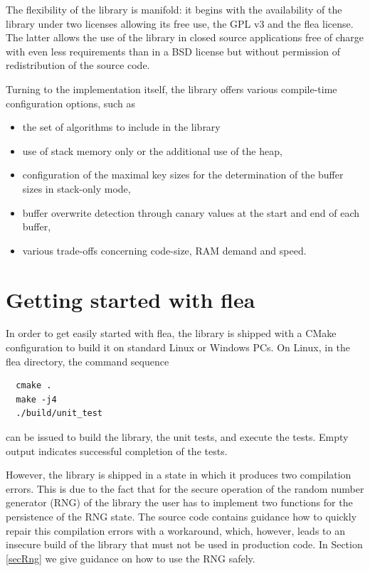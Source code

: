 \documentclass[a4paper,11pt]{scrartcl}
\begin{document}
The flexibility of the library is manifold: it begins with the availability of
the library under two licenses allowing its free use, the GPL v3 and the flea
license. The latter allows the use of the library in closed
source
applications free of charge with even less requirements than in a BSD license but without permission of redistribution of the
source code.

Turning to the implementation itself, the library offers various compile-time
configuration options, such as 
\begin{itemize}
  \item the set of algorithms to include in the library
  \item use of stack memory only or the additional use of the heap,
  \item configuration of the maximal key sizes for the determination of the
    buffer sizes in stack-only mode,
  \item buffer overwrite detection through canary values at the start and end of
    each buffer,
  \item various trade-offs concerning code-size, RAM demand and speed.
  \end{itemize}

  \section{Getting started with flea}

  In order to get easily started with flea, the library is shipped with a CMake
  configuration to build it on standard Linux or Windows PCs. On Linux, in the
  flea directory, the command sequence 
  \begin{verbatim}
  cmake .
  make -j4
  ./build/unit_test
  \end{verbatim}
  can be issued to build the library, the unit tests, and execute the tests.
  Empty output indicates successful completion of the tests.

  However, the library is shipped in a state in which it produces two
  compilation errors. This is due to the fact that for the secure operation of
  the random number generator (RNG) of the library the user has to implement two
  functions for the persistence of the RNG state. The source code contains
  guidance how to quickly repair this compilation errors with a workaround,
  which, however, leads to an insecure build of the library that must not be
  used in production code. In Section \ref{secRng} we give guidance on how to use
  the RNG safely.
\end{document}
